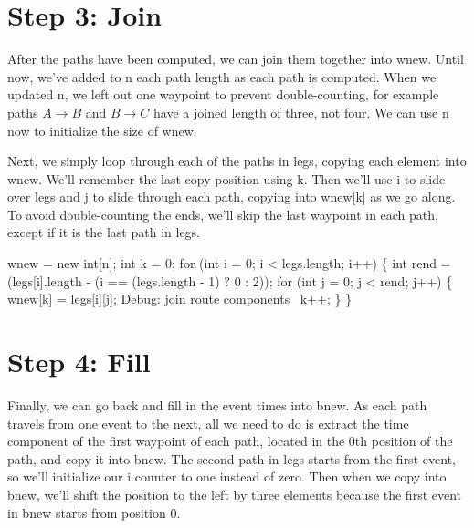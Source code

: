 \section{Step 3: Join}

After the paths have been computed, we can join them together into {\Tt{}wnew\nwendquote}.
Until now, we've added to {\Tt{}n\nwendquote} each path length as each path is computed.
When we updated {\Tt{}n\nwendquote}, we left out one waypoint to prevent double-counting,
for example paths $A\rightarrow B$ and $B\rightarrow C$ have a joined length
of three, not four. We can use {\Tt{}n\nwendquote} now to initialize the size of {\Tt{}wnew\nwendquote}.

Next, we simply loop through each of the paths in {\Tt{}legs\nwendquote}, copying each
element into {\Tt{}wnew\nwendquote}. We'll remember the last copy position using {\Tt{}k\nwendquote}.
Then we'll use {\Tt{}i\nwendquote} to slide over {\Tt{}legs\nwendquote} and {\Tt{}j\nwendquote} to slide through each
path, copying into {\Tt{}wnew[k]\nwendquote} as we go along. To avoid double-counting the
ends, we'll skip the last waypoint in each path, except if it is the last
path in {\Tt{}legs\nwendquote}.

\nwenddocs{}\endmoddef\nwstartdeflinemarkup{}\nwenddeflinemarkup
wnew = new int[n];
int k = 0;
for (int i = 0; i < legs.length; i++) \{
  int rend = (legs[i].length - (i == (legs.length - 1) ? 0 : 2));
  for (int j = 0; j < rend; j++) \{
    wnew[k] = legs[i][j];
    \LA{}Debug: join route components~{\nwtagstyle{}}\RA{}
    k++;
  \}
\}
\nwendcode{}\nwdocspar

\section{Step 4: Fill}

Finally, we can go back and fill in the event times into {\Tt{}bnew\nwendquote}. As each path
travels from one event to the next, all we need to do is extract the time
component of the first waypoint of each path, located in the 0th position of
the path, and copy it into {\Tt{}bnew\nwendquote}. The second path in {\Tt{}legs\nwendquote} starts from
the first event, so we'll initialize our {\Tt{}i\nwendquote} counter to one instead of zero.
Then when we copy into {\Tt{}bnew\nwendquote}, we'll shift the position to the left by three
elements because the first event in {\Tt{}bnew\nwendquote} starts from position 0.

